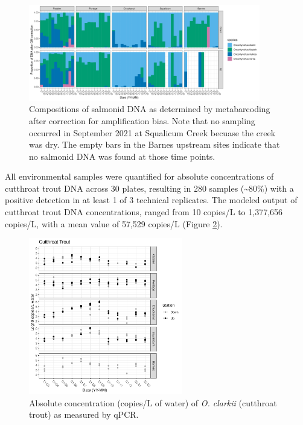 \documentclass[
]{article}
\begin{document}
\begin{figure}
\centering
\includegraphics[width=0.9\textwidth,height=\textheight]{../Output/Figures/20221123_proportions_after_qm.png}
\caption{Compositions of salmonid DNA as determined by metabarcoding
after correction for amplification bias. Note that no sampling occurred
in September 2021 at Squalicum Creek becuase the creek was dry. The
empty bars in the Barnes upstream sites indicate that no salmonid DNA
was found at those time points.\label{fig:qm}}
\end{figure}

All environmental samples were quantified for absolute concentrations of
cutthroat trout DNA across 30 plates, resulting in 280 samples
(\textasciitilde80\%) with a positive detection in at least 1 of 3
technical replicates. The modeled output of cutthroat trout DNA
concentrations, ranged from 10 copies/L to 1,377,656 copies/L, with a
mean value of 57,529 copies/L (Figure \ref{fig:qpcr}).

\begin{figure}
\centering
\includegraphics[width=0.6\textwidth,height=\textheight]{../Output/Figures/20221129_modeled_cut_qpcr_updown.png}
\caption{Absolute concentration (copies/L of water) of \emph{O. clarkii}
(cutthroat trout) as measured by qPCR.\label{fig:qpcr}}
\end{figure}
\end{document}
